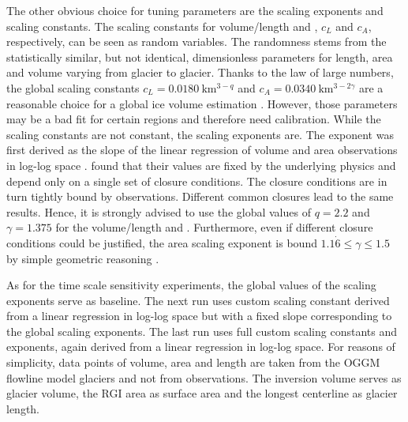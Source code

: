         The other obvious choice for tuning parameters are the scaling exponents and scaling constants. The scaling constants for volume/length and \vas{}, $c_L$ and $c_A$, respectively, can be seen as random variables. The randomness stems from the statistically similar, but not identical, dimensionless parameters for length, area and volume  varying from glacier to glacier. Thanks to the law of large numbers, the global scaling constants $c_L = \SI{0.0180}{\kilo\meter^{3-q}}$ and $c_A = \SI{0.0340}{\kilo\meter^{3-2\gamma}}$ are a reasonable choice for a global ice volume estimation \citep{Bahr2015}. However, those parameters may be a bad fit for certain regions and therefore need calibration.
        While the scaling constants are not constant, the scaling exponents are. The \vas{} exponent was first derived as the slope of the linear regression of volume and area observations in log-log space \citep[e.g.,][]{Chen1990}. \citet{Bahr1997b} found that their values are fixed by the underlying physics and depend only on a single set of closure conditions. The closure conditions are in turn tightly bound by observations. Different common closures lead to the same results. Hence, it is strongly advised to use the global values of $q = 2.2$ and $\gamma = 1.375$  for the volume/length and \vas{}. Furthermore, even if different closure conditions could be justified, the area scaling exponent is bound $1.1\dot{6} \leq \gamma \leq 1.5$ by simple geometric reasoning \citep[Section 8.2]{Bahr2015}. 

        As for the time scale sensitivity experiments, the global values of the scaling exponents serve as baseline. The next run uses custom scaling constant derived from a linear regression in log-log space but with a fixed slope corresponding to the global scaling exponents. The last run uses full custom scaling constants and exponents, again derived from a linear regression in log-log space. For reasons of simplicity, data points of volume, area and length are taken from the OGGM flowline model glaciers and not from observations. The inversion volume serves as glacier volume, the RGI area as surface area and the longest centerline as glacier length.
        

